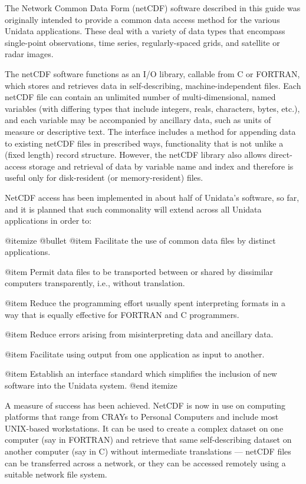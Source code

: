The Network Common Data Form (netCDF) software described in this guide
was originally intended to provide a common data access method for the
various Unidata applications.  These deal with a variety of data types
that encompass single-point observations, time series, regularly-spaced
grids, and satellite or radar images.

The netCDF software functions as an I/O library, callable from C or
FORTRAN, which stores and retrieves data in
self-describing, machine-independent files.  Each netCDF file can contain an
unlimited number of multi-dimensional, named variables (with differing
types that include integers, reals, characters, bytes, etc.), and each
variable may be accompanied by ancillary data, such as units of measure
or descriptive text.  The interface includes a method for appending data
to existing netCDF files in prescribed ways, functionality that is not
unlike a (fixed length) record structure.  However, the netCDF library
also allows direct-access storage and retrieval of data by variable name
and index and therefore is useful only for disk-resident (or
memory-resident) files.

NetCDF access has been implemented in about half of Unidata's software,
so far, and it is planned that such commonality will extend across all
Unidata applications in order to:

@itemize @bullet
@item
Facilitate the use of common data files by distinct applications.

@item
Permit data files to be transported between or shared by dissimilar
computers transparently, i.e., without translation.

@item
Reduce the programming effort usually spent interpreting formats in a
way that is equally effective for FORTRAN and C programmers.

@item
Reduce errors arising from misinterpreting data and ancillary data.

@item
Facilitate using output from one application as input to another.

@item
Establish an interface standard which simplifies the inclusion of new
software into the Unidata system.
@end itemize

A measure of success has been achieved.  NetCDF is now in use on
computing platforms that range from CRAYs to Personal Computers and
include most UNIX-based workstations.  It can be used to
create a complex dataset on one computer (say in FORTRAN) and retrieve
that same self-describing dataset on another computer (say in C)
without intermediate translations --- netCDF files can be transferred
across a network, or they can be accessed remotely using a suitable
network file system.

